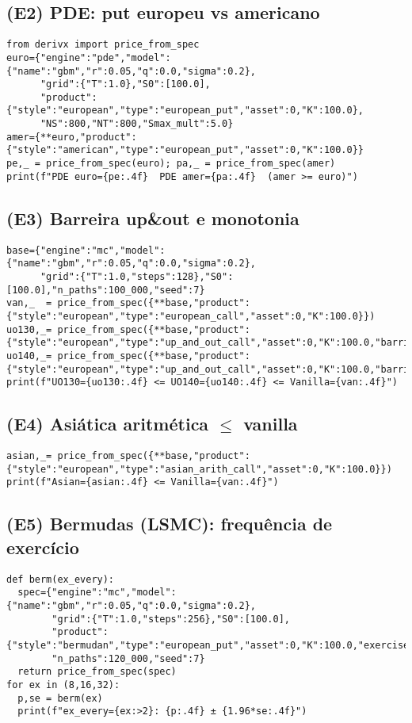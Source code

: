 \documentclass[11pt,a4paper]{article}
\begin{document}
\subsection{(E2) PDE: put europeu vs americano}
\begin{lstlisting}[style=pystyle]
from derivx import price_from_spec
euro={"engine":"pde","model":{"name":"gbm","r":0.05,"q":0.0,"sigma":0.2},
      "grid":{"T":1.0},"S0":[100.0],
      "product":{"style":"european","type":"european_put","asset":0,"K":100.0},
      "NS":800,"NT":800,"Smax_mult":5.0}
amer={**euro,"product":{"style":"american","type":"european_put","asset":0,"K":100.0}}
pe,_ = price_from_spec(euro); pa,_ = price_from_spec(amer)
print(f"PDE euro={pe:.4f}  PDE amer={pa:.4f}  (amer >= euro)")
\end{lstlisting}

\subsection{(E3) Barreira up\&out e monotonia}
\begin{lstlisting}[style=pystyle]
base={"engine":"mc","model":{"name":"gbm","r":0.05,"q":0.0,"sigma":0.2},
      "grid":{"T":1.0,"steps":128},"S0":[100.0],"n_paths":100_000,"seed":7}
van,_  = price_from_spec({**base,"product":{"style":"european","type":"european_call","asset":0,"K":100.0}})
uo130,_= price_from_spec({**base,"product":{"style":"european","type":"up_and_out_call","asset":0,"K":100.0,"barrier":130.0}})
uo140,_= price_from_spec({**base,"product":{"style":"european","type":"up_and_out_call","asset":0,"K":100.0,"barrier":140.0}})
print(f"UO130={uo130:.4f} <= UO140={uo140:.4f} <= Vanilla={van:.4f}")
\end{lstlisting}

\subsection{(E4) Asiática aritmética $\le$ vanilla}
\begin{lstlisting}[style=pystyle]
asian,_= price_from_spec({**base,"product":{"style":"european","type":"asian_arith_call","asset":0,"K":100.0}})
print(f"Asian={asian:.4f} <= Vanilla={van:.4f}")
\end{lstlisting}

\subsection{(E5) Bermudas (LSMC): frequência de exercício}
\begin{lstlisting}[style=pystyle]
def berm(ex_every):
  spec={"engine":"mc","model":{"name":"gbm","r":0.05,"q":0.0,"sigma":0.2},
        "grid":{"T":1.0,"steps":256},"S0":[100.0],
        "product":{"style":"bermudan","type":"european_put","asset":0,"K":100.0,"exercise_every":ex_every},
        "n_paths":120_000,"seed":7}
  return price_from_spec(spec)
for ex in (8,16,32):
  p,se = berm(ex)
  print(f"ex_every={ex:>2}: {p:.4f} ± {1.96*se:.4f}")
\end{lstlisting}
\end{document}
